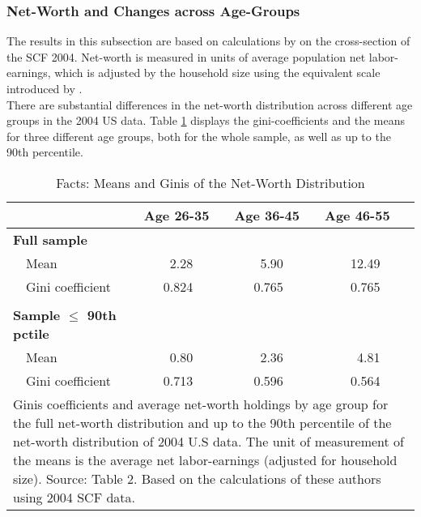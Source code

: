 \documentclass[a4paper,12pt,legno]{article}
\begin{document}
\subsubsection{Net-Worth and Changes across Age-Groups}
The results in this subsection are based on calculations by \cite{hintermaier2011} on the cross-section of the SCF 2004. Net-worth is measured in units of average population net labor- earnings, which is adjusted by the household size using the equivalent scale introduced by \cite{fernandez2007consumption}. \\
There are substantial differences in the net-worth distribution across different age groups in the 2004 US data. 
Table \ref{facts_changes} displays the gini-coefficients and the means for three different age groups, both for the whole sample, as well as up to the 90th percentile.\\ 

\begin{table}[!htbp]
\centering
\caption{Facts: Means and Ginis of the Net-Worth Distribution}
\label{facts_changes}
\begin{tabular}{@{}llll@{}}
\toprule
                     & Age 26-35 & Age 36-45 & Age 46-55 \\ \midrule
\textbf{Full sample}          &           &           &           \\
\ \ Mean                 & \ \ \ \ 2.28      & \ \ \ \ 5.90      & \ \ \ \ 12.49     \\
\ \ Gini coefficient     & \ \ \ 0.824     & \ \ \ 0.765     & \ \ \ \ 0.765     \\ \\
\textbf{Sample $\leq$ 90th pctile} &           &           &           \\
\ \ Mean                 & \ \ \ \ 0.80      & \ \ \ \ 2.36      & \ \ \ \ \ 4.81      \\
\ \ Gini coefficient     & \ \ \ 0.713     & \ \ \ 0.596     & \ \ \ \ 0.564     \\ \bottomrule
\multicolumn{4}{l}{%
  \begin{minipage}{11.5cm}%
    \small Ginis coefficients and average net-worth holdings by age group for the full net-worth distribution and up to the 90th percentile of the net-worth distribution of 2004 U.S data. The unit of measurement of the means is the average net labor-earnings (adjusted for household size). Source: \cite{hintermaier2011} Table 2. Based on the calculations of these authors using 2004 SCF data. 
  \end{minipage}%
}\\
\end{tabular}
\end{table}
\end{document}
